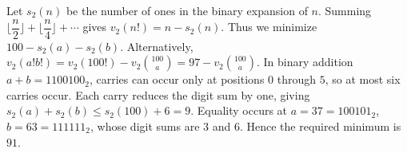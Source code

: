 Let $s_2(n)$ be the number of ones in the binary expansion of $n$. Summing $\lfloor \dfrac{n}{2} \rfloor + \lfloor \dfrac{n}{4} \rfloor + \cdots$ gives $v_2(n!)=n-s_2(n)$. Thus we minimize $100-s_2(a)-s_2(b)$. Alternatively, $v_2(a!b!)=v_2(100!)-v_2\binom{100}a=97-v_2\binom{100}a$. In binary addition $a+b=1100100_2$, carries can occur only at positions $0$ through $5$, so at most six carries occur. Each carry reduces the digit sum by one, giving $s_2(a)+s_2(b)\le s_2(100)+6=9$. Equality occurs at $a=37=100101_2$, $b=63=111111_2$, whose digit sums are $3$ and $6$. Hence the required minimum is $\boxed{91}$.
